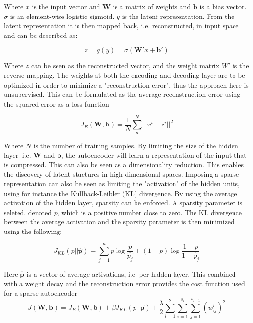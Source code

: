 \documentclass{article}
\begin{document}
Where $x$ is the input vector and $\mathbf{W}$ is a matrix of weights and $\mathbf{b}$ is a bias vector. $\sigma$ is an element-wise logistic sigmoid. $y$ is the latent representation. From the latent representation it is then mapped back, i.e. reconstructed, in input space and can be described as:

\begin{equation}
z = g(y) = \sigma(\mathbf{W'}x + \mathbf{b'})
\end{equation}

Where $z$ can be seen as the reconstructed vector, and the weight matrix $W'$ is the reverse mapping. The weights at both the encoding and decoding layer are to be optimized in order to minimize a "reconstruction error", thus the approach here is unsupervised. This can be formulated as the average reconstruction error using the squared error as a loss function

\begin{equation}
J_E(\mathbf{W},\mathbf{b}) = \frac{1}{N} \sum_n^N || x^i - z^i || ^2
\end{equation}

Where $N$ is the number of training samples. By limiting the size of the hidden layer, i.e. $\mathbf{W}$ and $\mathbf{b}$, the autoencoder will learn a representation of the input that is compressed. This can also be seen as a dimensionality reduction. This enables the discovery of latent stuctures in high dimensional spaces. 
Imposing a sparse representation can also be seen as limiting the "activation" of the hidden units, using for instance the Kullback-Leibler (KL) divergence. By using the average activation of the hidden layer, sparsity can be enforced. A sparsity parameter is seleted, denoted $p$, which is a positive number close to zero. The KL divergence between the average activation and the sparsity parameter is then minimized using the following:

\begin{equation}
  J_{KL}(p || \hat{\mathbf{p}}) = \sum_{j=1}^n p \log\frac{p}{\hat{p_{j}}} + (1-p) \log\frac{1-p}{1-\hat{p}_j}
\end{equation} \label{eq:sparse}

Here $\hat{\mathbf{p}}$ is a vector of average activations, i.e. per hidden-layer. This combined with a weight decay and the reconstruction error provides the cost function used for a sparse autoencoder, \cite{Hosseini-Asl2016}
\begin{equation}\label{eq:lossfunc}
J(\mathbf{W},\mathbf{b}) = J_E(\mathbf{W},\mathbf{b}) + \beta J_{KL}(p || \hat{\mathbf{p}}) + \frac{\lambda}{2}\sum_{l=1}^2\sum_{i=1}^{s_l}\sum_{j=1}^{s_{l+1}} (w_{ij}^{l})^2
\end{equation}
\end{document}
